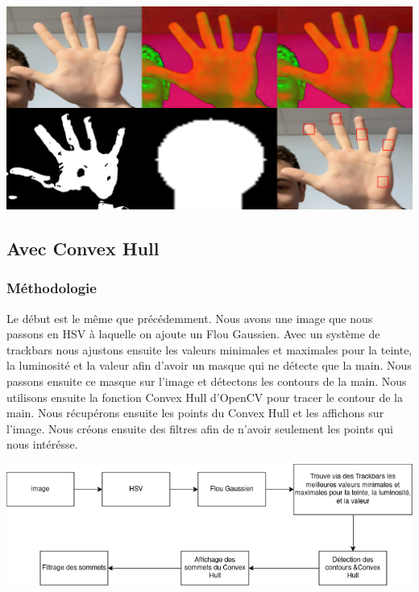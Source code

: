 \documentclass[11pt]{article}
\begin{document}
\begin{center}
    \includegraphics[width=\textwidth]{images/detect_fingers_mask_3.png}
    \label{fig:detect_fingers_mask_3}
\end{center}

\newpage


\subsection{Avec Convex Hull}
\subsubsection{Méthodologie}
Le début est le même que précédemment. Nous avons une image que nous passons en HSV à laquelle on ajoute un Flou Gaussien. Avec un système de trackbars nous ajustons ensuite les valeurs minimales et maximales pour la teinte, la luminosité et la valeur afin d'avoir un masque qui ne détecte que la main. Nous passons ensuite ce masque sur l'image et détectons les contours de la main. Nous utilisons ensuite la fonction Convex Hull d'OpenCV pour tracer le contour de la main. Nous récupérons ensuite les points du Convex Hull et les affichons sur l'image. Nous créons ensuite des filtres afin de n'avoir seulement les points qui nous intérésse. \bigbreak

\begin{center}
    \includegraphics[width=\textwidth]{images/pipeline_detect_fingers_avec_convex_hull.png}
    \label{fig:pipeline_detect_fingers_avec_convex_hull}
\end{center}
\end{document}
